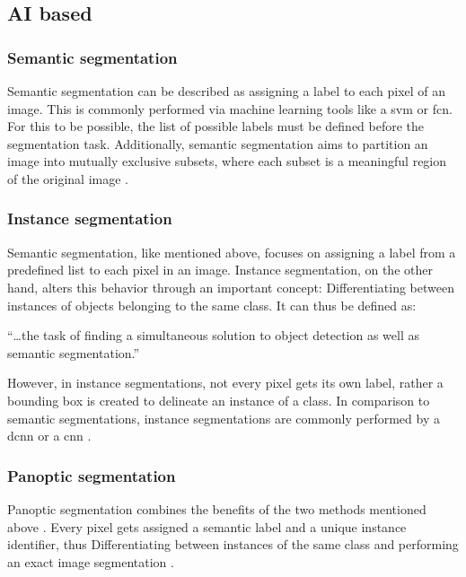 \subsection{AI based}\label{s:b-seg-ai}

\subsubsection{Semantic segmentation}
Semantic segmentation can be described as assigning a label to each pixel of an image.
This is commonly performed via machine learning tools like a \acrfull{svm} or \acrfull{fcn}.
For this to be possible, the list of possible labels must be defined before the segmentation task.
Additionally, semantic segmentation aims to partition an image into mutually exclusive subsets,
where each subset is a meaningful region of the original image \cite{haoBriefSurveySemantic2020,longFullyConvolutionalNetworks2015}.

\subsubsection{Instance segmentation}
Semantic segmentation, like mentioned above, focuses on assigning a label from a predefined list to each pixel in an image.
Instance segmentation, on the other hand, alters this behavior through an important concept:
Differentiating between instances of objects belonging to the same class.
It can thus be defined as:
\begin{displayquote}
	``\ldots\space the task of finding a simultaneous solution to object detection as well as semantic segmentation.''
\end{displayquote}
However, in instance segmentations, not every pixel gets its own label, rather a bounding box is created to delineate an instance of a class.
In comparison to semantic segmentations, instance segmentations are commonly performed by a \acrfull{dcnn} or a \acrfull{cnn} \cite{hafizSurveyInstanceSegmentation2020,chenMaskLabInstanceSegmentation2018}.

\subsubsection{Panoptic segmentation}
Panoptic segmentation combines the benefits of the two methods mentioned above
\cite{kirillovPanopticSegmentation2019}.
Every pixel gets assigned a semantic label and a unique instance identifier,
thus Differentiating between instances of the same class and performing an exact image segmentation
\cite{kirillovPanopticSegmentation2019}.

